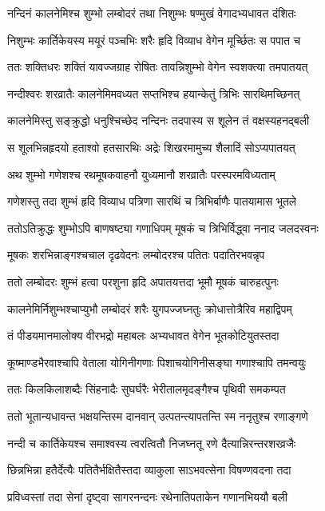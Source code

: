\twolineshloka
{नन्दिनं कालनेमिश्च शुम्भो लम्बोदरं तथा}
{निशुम्भः षण्मुखं वेगादभ्यधावत दंशितः} %

\twolineshloka
{निशुम्भः कार्तिकेयस्य मयूरं पञ्चभिः शरैः}
{हृदि विव्याध वेगेन मूर्च्छितः स पपात च} %

\twolineshloka
{ततः शक्तिधरः शक्तिं यावज्जग्राह रोषितः}
{तावन्निशुम्भो वेगेन स्वशक्त्या तमपातयत्} %

\twolineshloka
{नन्दीश्वरः शरव्रातैः कालनेमिमवध्यत}
{सप्तभिश्च हयान्केतुं त्रिभिः सारथिमच्छिनत्} %

\twolineshloka
{कालनेमिस्तु सङ्क्रुद्धो धनुश्चिच्छेद नन्दिनः}
{तदपास्य स शूलेन तं वक्षस्यहनद्बली} %

\twolineshloka
{स शूलभिन्नहृदयो हताश्वो हतसारथिः}
{अद्रेः शिखरमामुच्य शैलादिं सोऽप्यपातयत्} %

\twolineshloka
{अथ शुम्भो गणेशश्च रथमूषकवाहनौ}
{युध्यमानौ शरव्रातैः परस्परमविध्यताम्} %

\twolineshloka
{गणेशस्तु तदा शुम्भं हृदि विव्याध पत्रिणा}
{सारथिं च त्रिभिर्बाणैः पातयामास भूतले} %

\twolineshloka
{ततोऽतिक्रुद्धः शुम्भोऽपि बाणषष्ट्या गणाधिपम्}
{मूषकं च त्रिभिर्विद्ध्वा ननाद जलदस्वनः} %

\twolineshloka
{मूषकः शरभिन्नाङ्गश्चचाल दृढवेदनः}
{लम्बोदरश्च पतितः पदातिरभवन्नृप} %

\twolineshloka
{ततो लम्बोदरः शुम्भं हत्वा परशुना हृदि}
{अपातयत्तदा भूमौ मूषकं चारुहत्पुनः} %

\twolineshloka
{कालनेमिर्निशुम्भश्चाप्युभौ लम्बोदरं शरैः}
{युगपज्जघ्नतुः क्रोधात्तोत्रैरिव महाद्विपम्} %

\twolineshloka
{तं पीडयमानमालोक्य वीरभद्रो महाबलः}
{अभ्यधावत वेगेन भूतकोटियुतस्तदा} %

\twolineshloka
{कूष्माण्डभैरवाश्चापि वेताला योगिनीगणाः}
{पिशाचयोगिनीसङ्घा गणाश्चापि तमन्वयुः} %

\twolineshloka
{ततः किलकिलाशब्दैः सिंहनादैः सुघर्घरैः}
{भेरीतालमृदङ्गैश्च पृथिवी समकम्पत} %

\twolineshloka
{ततो भूतान्यधावन्त भक्षयन्तिस्म दानवान्}
{उत्पतन्त्यापतन्ति स्म ननृतुश्च रणाङ्गणे} %

\twolineshloka
{नन्दी च कार्तिकेयश्च समाश्वस्य त्वरत्वितौ}
{निजघ्नतू रणे दैत्यान्निरन्तरशरव्रजैः} %

\twolineshloka
{छिन्नभिन्ना हतैर्देत्यैः पतितैर्भक्षितैस्तदा}
{व्याकुला साऽभवत्सेना विषण्णवदना तदा} %

\twolineshloka
{प्रविध्वस्तां तदा सेनां दृष्ट्वा सागरनन्दनः}
{रथेनातिपताकेन गणानभिययौ बली} %

